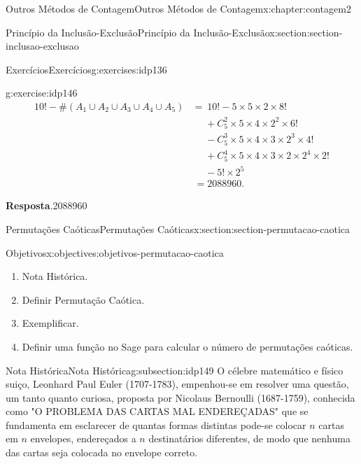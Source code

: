 \documentclass[oneside,10pt,]{book}
\newcommand{\blocktitlefont}{\relax}
\numberwithin{equation}{section}
\newcommand{\amp}{&}
\begin{document}
\begin{chapterptx}{Outros Métodos de Contagem}{}{Outros Métodos de Contagem}{}{}{x:chapter:contagem2}
\begin{sectionptx}{Princípio da Inclusão-Exclusão}{}{Princípio da Inclusão-Exclusão}{}{}{x:section:section-inclusao-exclusao}
\begin{exercises-subsection}{Exercícios}{}{Exercícios}{}{}{g:exercises:idp136}
\begin{divisionexercise}{5}{}{}{g:exercise:idp146}
\begin{align*}
10! - \#(A_1\cup A_2\cup A_3\cup A_4\cup A_5) \amp =  ~ 10! - 5\times 5\times 2\times 8!   \\
\amp   ~~~~~~ + C_5^2\times 5\times 4\times 2^2\times 6!\\
\amp   ~~~~~~ -C_5^3\times 5\times 4\times 3\times2^3\times 4!  \\
\amp   ~~~~~~ +C_5^4\times 5\times 4\times 3\times 2\times 2^4\times 2!   \\
\amp   ~~~~~~ - 5!\times 2^5\\
\amp ~ = 2088960. 
\end{align*}
\par\smallskip%
\noindent\textbf{\blocktitlefont Resposta}.\hypertarget{g:answer:idp148}{}\quad{}2088960%
\end{divisionexercise}%
\end{exercises-subsection}
\end{sectionptx}
%
%
\typeout{************************************************}
\typeout{************************************************}
%
\begin{sectionptx}{Permutações Caóticas}{}{Permutações Caóticas}{}{}{x:section:section-permutacao-caotica}
\begin{objectives}{Objetivos}{x:objectives:objetivos-permutacao-caotica}
%
\begin{enumerate}
\item{}Nota Histórica.%
\item{}Definir Permutação Caótica.%
\item{}Exemplificar.%
\item{}Definir uma função no Sage para calcular o número de permutações caóticas.%
\end{enumerate}
\end{objectives}
%
%
\typeout{************************************************}
\typeout{************************************************}
%
\begin{subsectionptx}{Nota Histórica}{}{Nota Histórica}{}{}{g:subsection:idp149}
O célebre matemático e físico suiço, Leonhard Paul Euler (1707-1783), empenhou-se em resolver uma questão, um tanto quanto curiosa, proposta por Nicolaus Bernoulli (1687-1759), conhecida como "O PROBLEMA DAS CARTAS MAL ENDEREÇADAS"  que se fundamenta em esclarecer de quantas formas distintas pode-se colocar \(n\) cartas em \(n\) envelopes, endereçados a \(n\) destinatários diferentes, de modo que nenhuma das cartas seja colocada no envelope correto.%
\par

\end{subsectionptx}
\end{sectionptx}
\end{chapterptx}
\end{document}

